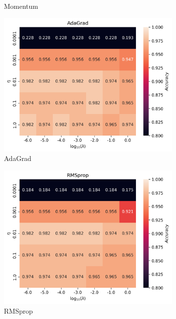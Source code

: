 \documentclass[11pt]{article}
\begin{document}
\begin{figure}[H]
\begin{subfigure}{.5\textwidth}
        \caption{Momentum}
        \label{fig:}
    \end{subfigure}
    \begin{subfigure}{.5\textwidth}
        \centering
        \includegraphics[width=.95\textwidth]{../figures/logreg_AdaGrad.png}
        \caption{AdaGrad}
        \label{fig:}
    \end{subfigure}
    \begin{subfigure}{.5\textwidth}
        \centering
        \includegraphics[width=.95\textwidth]{../figures/logreg_RMSprop.png}
        \caption{RMSprop}
        \label{fig:}
    \end{subfigure}
    \begin{subfigure}{.95\textwidth}

\end{subfigure}
\end{figure}
\end{document}
